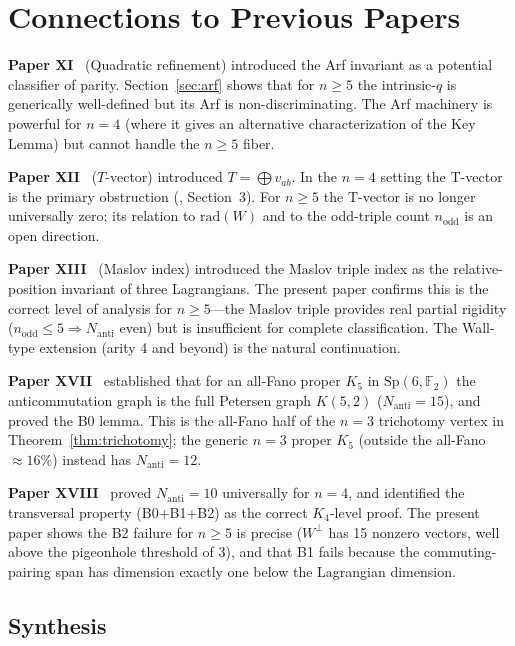 \documentclass[11pt,a4paper]{article}
\theoremstyle{remark}
\newcommand{\Sp}{\mathrm{Sp}}
\newcommand{\rad}{\mathrm{rad}}
\newcommand{\Nanti}{N_{\mathrm{anti}}}
\begin{document}
\section{Connections to Previous Papers}\label{sec:connections}

\textbf{Paper XI}~\cite{PaperXI} (Quadratic refinement) introduced the Arf invariant as a potential
classifier of parity.  Section~\ref{sec:arf} shows that for $n\ge5$ the intrinsic-$q$
is generically well-defined but its Arf is non-discriminating.  The Arf machinery is
powerful for $n=4$ (where it gives an alternative characterization of the Key Lemma)
but cannot handle the $n\ge5$ fiber.

\textbf{Paper XII}~\cite{PaperXII} ($T$-vector) introduced $T=\bigoplus v_{ab}$.
In the $n=4$ setting the T-vector is the primary obstruction
(\cite{PaperXVIII}, Section~3).  For $n\ge5$ the T-vector is no longer universally
zero; its relation to $\rad(W)$ and to the odd-triple count $n_{\mathrm{odd}}$ is
an open direction.

\textbf{Paper XIII}~\cite{PaperXIII} (Maslov index) introduced the Maslov triple index
as the relative-position invariant of three Lagrangians.  The present paper confirms
this is the correct level of analysis for $n\ge5$---the Maslov triple provides real
partial rigidity ($n_{\mathrm{odd}}\le5\Rightarrow\Nanti$ even) but is insufficient
for complete classification.  The Wall-type extension (arity 4 and beyond) is the
natural continuation.

\textbf{Paper XVII}~\cite{PaperXVII} established that for an all-Fano proper $K_5$ in
$\Sp(6,\mathbb F_2)$ the anticommutation graph is the full Petersen graph $K(5,2)$
($\Nanti=15$), and proved the B0 lemma.  This is the all-Fano half of the $n=3$
trichotomy vertex in Theorem~\ref{thm:trichotomy}; the generic $n=3$ proper $K_5$
(outside the all-Fano $\approx16\%$) instead has $\Nanti=12$.

\textbf{Paper XVIII}~\cite{PaperXVIII} proved $\Nanti=10$ universally for $n=4$, and
identified the transversal property (B0+B1+B2) as the correct $K_4$-level proof.
The present paper shows the B2 failure for $n\ge5$ is precise ($W^\perp$ has 15
nonzero vectors, well above the pigeonhole threshold of 3), and that B1 fails because
the commuting-pairing span has dimension exactly one below the Lagrangian dimension.

\subsection*{Synthesis}
\end{document}

